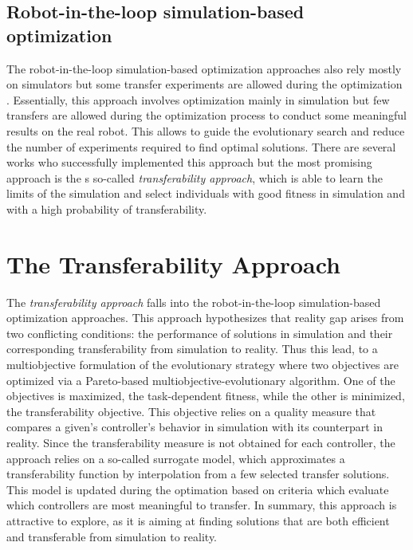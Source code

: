 \subsection{Robot-in-the-loop simulation-based optimization}

The robot-in-the-loop simulation-based optimization approaches also rely mostly on simulators but some transfer experiments are allowed during the optimization \citep{inproceedings}. Essentially, this approach involves optimization mainly in simulation but few transfers are allowed during the optimization process to conduct some meaningful results on the real robot. This allows to guide the evolutionary search and reduce the number of experiments required to find optimal solutions. There are several works who successfully implemented this approach \citep{bongard2006resilient} \citep{koos2009automatic} but the most promising approach is the s so-called \emph{transferability approach}, which is able to learn the limits of the simulation and select individuals with good fitness in simulation and with a high probability of transferability.

\section{The Transferability Approach}

The \emph{transferability approach} falls into the robot-in-the-loop simulation-based optimization approaches. This approach hypothesizes that reality gap arises from two conflicting conditions: the performance of solutions in simulation and their corresponding transferability from simulation to reality. Thus this lead, to a multiobjective formulation of the evolutionary strategy where two objectives are optimized via a Pareto-based multiobjective-evolutionary algorithm. One of the objectives is maximized, the task-dependent fitness, while the other is minimized, the transferability objective. This objective relies on a quality measure that compares a given's controller's behavior in simulation with its counterpart in reality.  Since the transferability measure is not obtained for each controller, the approach relies on a so-called surrogate model, which approximates a transferability function by interpolation from a few selected transfer solutions. This model is updated during the optimation based on criteria which evaluate which controllers are most meaningful to transfer. In summary, this approach is attractive to explore, as it is aiming at finding solutions that are both efficient and transferable from simulation to reality.

